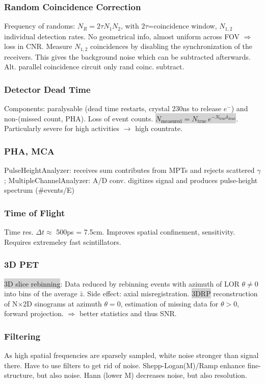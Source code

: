 \documentclass[9pt]{article}
\newcommand{\grey}[1]{\setlength{\fboxsep}{0pt}\colorbox{lightgrey}{#1}}
\begin{document}
\begin{multicols}{2}
\subsubsection{Random Coincidence Correction} Frequency of randoms: $N_R = 2\tau N_1N_2$, with $2\tau$=coincidence window, $N_{1,2}$ individual detection rates. No geometrical info, almost uniform across FOV $\Rightarrow$ loss in CNR. Measure $N_{1,2}$ coincidences by disabling the synchronization of the receivers. This gives the background noise which can be subtracted afterwards. Alt. parallel coincidence circuit only rand coinc. subtract.

\subsubsection{Detector Dead Time} Components: paralysable (dead time restarts, crystal 230ns to release $e^{-}$) and non-(missed count, PHA). Loss of event counts. \grey{$N_\mathrm{measured} = N_\mathrm{true} \, e^{-N_\mathrm{true} \delta_\mathrm{dead}}$}. Particularly severe for high activities $\rightarrow$ high countrate.

\subsubsection{PHA, MCA} PulseHeightAnalyzer: receives sum contributes from MPTs and rejects scattered $\gamma$; MultipleChannelAnalyzer: A/D conv. digitizes signal and produces pulse-height spectrum ($\#$events/E)

\subsubsection{Time of Flight} Time res. $\Delta t \approx$ 500ps = 7.5cm. Improves spatial confinement, sensitivity. Requires extremeley fast scintillators.

\subsubsection{3D PET} \grey{3D slice rebinning}: Data reduced by rebinning events with azimuth of LOR $\theta\neq0$ into bins of the average $\bar{z}$. Side effect: axial misregistration. \grey{3DRP} reconstruction of N$\times$2D sinograms at azimuth $\theta=0$, estimation of missing data for $\theta>0$, forward projection. $\Rightarrow$ better statistics and thus SNR.

\subsubsection{Filtering} As high spatial frequencies are sparsely sampled, white noise stronger than signal there. Have to use filters to get rid of noise. Shepp-Logan(M)/Ramp enhance fine-structure, but also noise. Hann (lower M) decreases noise, but also resolution.

\end{multicols}
\end{document}
